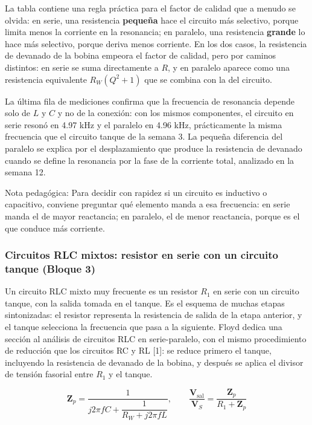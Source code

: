 \documentclass[11pt,letterpaper]{article}
\begin{document}
La tabla contiene una regla práctica para el factor de calidad que a menudo se olvida: en serie, una resistencia \textbf{pequeña} hace el circuito más selectivo, porque limita menos la corriente en la resonancia; en paralelo, una resistencia \textbf{grande} lo hace más selectivo, porque deriva menos corriente. En los dos casos, la resistencia de devanado de la bobina empeora el factor de calidad, pero por caminos distintos: en serie se suma directamente a $R$, y en paralelo aparece como una resistencia equivalente $R_W(Q^2 + 1)$ que se combina con la del circuito.

La última fila de mediciones confirma que la frecuencia de resonancia depende solo de $L$ y $C$ y no de la conexión: con los mismos componentes, el circuito en serie resonó en 4.97 kHz y el paralelo en 4.96 kHz, prácticamente la misma frecuencia que el circuito tanque de la semana 3. La pequeña diferencia del paralelo se explica por el desplazamiento que produce la resistencia de devanado cuando se define la resonancia por la fase de la corriente total, analizado en la semana 12.

\begin{nota}{Nota pedagógica:}
Para decidir con rapidez si un circuito es inductivo o capacitivo, conviene preguntar qué elemento \guillemotleft{}manda\guillemotright{} a esa frecuencia: en serie manda el de mayor reactancia; en paralelo, el de menor reactancia, porque es el que conduce más corriente.
\end{nota}

\subsubsection{Circuitos RLC mixtos: resistor en serie con un circuito tanque (Bloque 3)}

Un circuito RLC mixto muy frecuente es un resistor $R_1$ en serie con un circuito tanque, con la salida tomada en el tanque. Es el esquema de muchas etapas sintonizadas: el resistor representa la resistencia de salida de la etapa anterior, y el tanque selecciona la frecuencia que pasa a la siguiente. Floyd dedica una sección al análisis de circuitos RLC en serie-paralelo, con el mismo procedimiento de reducción que los circuitos RC y RL [1]: se reduce primero el tanque, incluyendo la resistencia de devanado de la bobina, y después se aplica el divisor de tensión fasorial entre $R_1$ y el tanque.

\begin{equation}
  \mathbf{Z}_p = \frac{1}{j2\pi f C + \dfrac{1}{R_W + j2\pi f L}}, \qquad \frac{\mathbf{V}_{\mathrm{sal}}}{\mathbf{V}_S} = \frac{\mathbf{Z}_p}{R_1 + \mathbf{Z}_p}
\end{equation}
\end{document}
